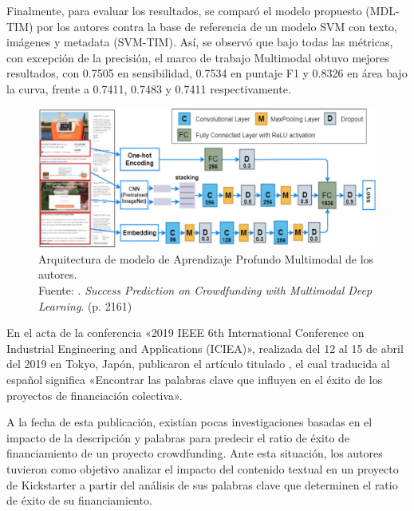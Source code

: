 Finalmente, para evaluar los resultados, se comparó el modelo propuesto (MDL-TIM) por los autores contra la base de referencia de un modelo SVM con texto, imágenes y metadata (SVM-TIM). Así, se observó que bajo todas las métricas, con excepción de la precisión, el marco de trabajo Multimodal obtuvo mejores resultados, con 0.7505 en sensibilidad, 0.7534 en puntaje F1 y 0.8326 en área bajo la curva, frente a 0.7411, 0.7483 y 0.7411 respectivamente.

\begin{figure}[!ht]
	\begin{center}
		\includegraphics[width=1\textwidth]{2/figures/cheng2019.jpg}
		\caption[Arquitectura de modelo de Aprendizaje Profundo Multimodal de los autores]{Arquitectura de modelo de Aprendizaje Profundo Multimodal de los autores.\\
		Fuente: \cite{pr_cheng2019deeplearning}. \textit{Success Prediction on Crowdfunding with Multimodal Deep Learning}. (p. 2161)}
		\label{2:fig125}
	\end{center}
\end{figure}

En el acta de la conferencia «2019 IEEE 6th International Conference on Industrial Engineering and Applications (ICIEA)», realizada del 12 al 15 de abril del 2019 en Tokyo, Japón, \cite{pr_chen2019keywords_crowdfunding} publicaron el artículo titulado , el cual traducida al español significa «Encontrar las palabras clave que influyen en el éxito de los proyectos de financiación colectiva».

A la fecha de esta publicación, existían pocas investigaciones basadas en el impacto de la descripción y palabras para predecir el ratio de éxito de financiamiento de un proyecto crowdfunding. Ante esta situación, los autores tuvieron como objetivo analizar el impacto del contenido textual en un proyecto de Kickstarter a partir del análisis de sus palabras clave que determinen el ratio de éxito de su financiamiento.

